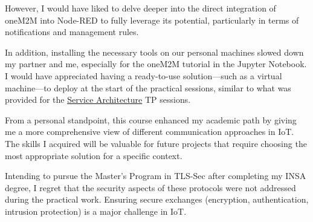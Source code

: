 However, I would have liked to delve deeper into the direct integration of oneM2M into Node-RED to fully leverage its potential, particularly in terms of notifications and management rules.

In addition, installing the necessary tools on our personal machines slowed down my partner and me, especially for the oneM2M tutorial in the Jupyter Notebook. I would have appreciated having a ready-to-use solution—such as a virtual machine—to deploy at the start of the practical sessions, similar to what was provided for the \hyperref[sec:service_architecture]{Service Architecture} TP sessions.

From a personal standpoint, this course enhanced my academic path by giving me a more comprehensive view of different communication approaches in IoT. The skills I acquired will be valuable for future projects that require choosing the most appropriate solution for a specific context.

Intending to pursue the Master’s Program in TLS-Sec after completing my INSA degree, I regret that the security aspects of these protocols were not addressed during the practical work. Ensuring secure exchanges (encryption, authentication, intrusion protection) is a major challenge in IoT.
